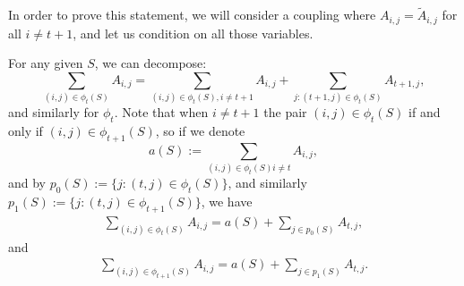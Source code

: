 \documentclass[10pt,a4paper]{article}
\begin{document}
In order to prove this statement, we will consider a coupling where $A_{i,j} = \tilde{A}_{i,j}$ for all $i \not=t+1$, and let us condition on all those variables. 

For any given $S$, we can decompose:
\begin{equation*}
    \sum_{(i,j) \in \phi_{t}(S)} A_{i,j} = \sum_{(i,j)\in \phi_{t}(S), i\not={t + 1}} A_{i,j} + \sum_{j : (t+1, j) \in \phi_{t}(S)} A_{t+1, j}, 
\end{equation*}
and similarly for $\phi_t$. Note that when $i\not=t+1$ the pair $(i,j) \in \phi_t(S)$ if and only if $(i, j) \in \phi_{t+1}(S)$, so if we denote
\begin{equation*}
    a(S) := \sum_{(i,j) \in \phi_t(S) i\not=t} A_{i,j},
\end{equation*}
and by $p_0(S) := \{j : (t, j) \in \phi_{t}(S)\}$, and similarly $p_1(S) := \{ j : (t, j) \in \phi_{t+1}(S)\}$, we have
\begin{align*}
    \sum_{(i,j) \in \phi_t(S)} A_{i,j} = a(S) + \sum_{j \in p_0(S)} A_{t, j},
\end{align*}
and
\begin{align*}
    \sum_{(i,j) \in \phi_{t+1}(S)} A_{i,j} = a(S) + \sum_{j \in p_1(S)} A_{t, j}.
\end{align*}
\end{document}
